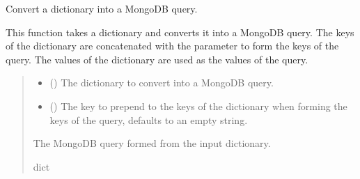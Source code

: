 \documentclass[letterpaper,10pt,english]{sphinxmanual}
\begin{document}
\begin{fulllineitems}
\label{\detokenize{forensicfit.database.database:forensicfit.database.database.dict2mongo_query}}
\pysigstartsignatures
{}
\pysigstopsignatures
\sphinxAtStartPar
Convert a dictionary into a MongoDB query.

\sphinxAtStartPar
This function takes a dictionary and converts it into a MongoDB query. The keys of the
dictionary are concatenated with the  parameter to form the keys of the query.
The values of the dictionary are used as the values of the query.
\begin{quote}\begin{description}
\sphinxAtStartPar
{}

\begin{itemize}
\item {} 
\sphinxAtStartPar
{} () \textendash{} The dictionary to convert into a MongoDB query.

\item {} 
\sphinxAtStartPar
{} (\sphinxstyleliteralemphasis{\sphinxupquote{, }}) \textendash{} The key to prepend to the keys of the dictionary when forming the keys of the query,
defaults to an empty string.

\end{itemize}

\sphinxAtStartPar
The MongoDB query formed from the input dictionary.

\sphinxAtStartPar
dict

\end{description}\end{quote}

\end{fulllineitems}

\end{document}
